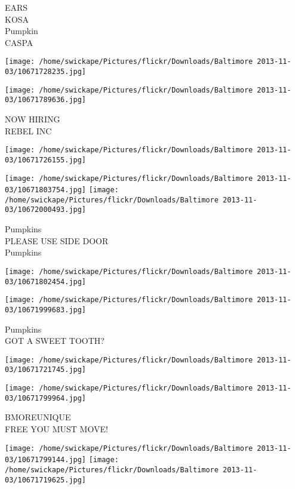 \documentclass[10pt,letterpaper]{article}
\begin{document}
EARS\\
KOSA\\
Pumpkin\\
CASPA\\
\pagebreak

\texttt{[image: /home/swickape/Pictures/flickr/Downloads/Baltimore 2013-11-03/10671728235.jpg]}

\vspace{0.25in}
\texttt{[image: /home/swickape/Pictures/flickr/Downloads/Baltimore 2013-11-03/10671789636.jpg]}

NOW HIRING\\
REBEL INC\\
\pagebreak

\texttt{[image: /home/swickape/Pictures/flickr/Downloads/Baltimore 2013-11-03/10671726155.jpg]}

\vspace{0.25in}
\texttt{[image: /home/swickape/Pictures/flickr/Downloads/Baltimore 2013-11-03/10671803754.jpg]}
\texttt{[image: /home/swickape/Pictures/flickr/Downloads/Baltimore 2013-11-03/10672000493.jpg]}

Pumpkins\\
PLEASE USE SIDE DOOR\\
Pumpkins\\
\pagebreak

\texttt{[image: /home/swickape/Pictures/flickr/Downloads/Baltimore 2013-11-03/10671802454.jpg]}

\vspace{0.25in}
\texttt{[image: /home/swickape/Pictures/flickr/Downloads/Baltimore 2013-11-03/10671999683.jpg]}

Pumpkins\\
GOT A SWEET TOOTH?\\
\pagebreak

\texttt{[image: /home/swickape/Pictures/flickr/Downloads/Baltimore 2013-11-03/10671721745.jpg]}

\vspace{0.25in}
\texttt{[image: /home/swickape/Pictures/flickr/Downloads/Baltimore 2013-11-03/10671799964.jpg]}

BMOREUNIQUE\\
FREE YOU MUST MOVE!\\
\pagebreak

\texttt{[image: /home/swickape/Pictures/flickr/Downloads/Baltimore 2013-11-03/10671799144.jpg]}
\texttt{[image: /home/swickape/Pictures/flickr/Downloads/Baltimore 2013-11-03/10671719625.jpg]}
\end{document}
